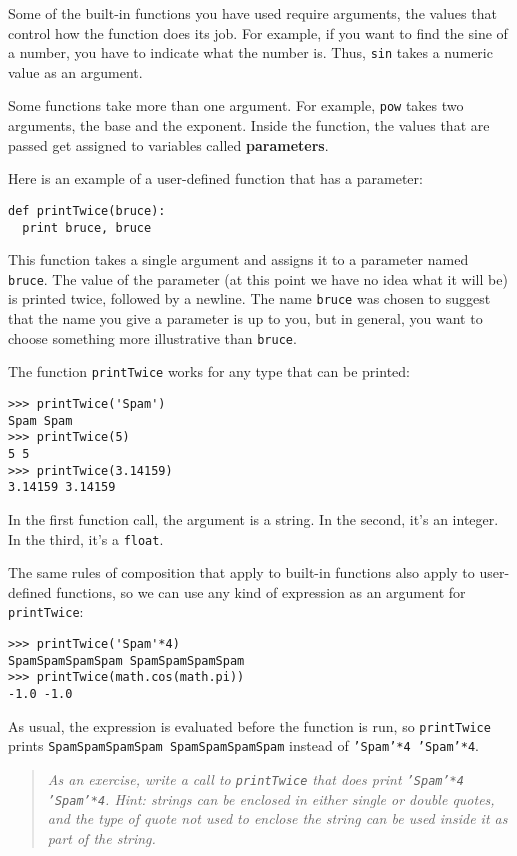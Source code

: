 Some of the built-in functions you have used require arguments, the
values that control how the function does its job.  For example, if
you want to find the sine of a number, you have to indicate what the
number is.  Thus, {\tt sin} takes a numeric value as an argument.

Some functions take more than one argument. For example, {\tt pow}
takes two arguments, the base and the exponent.  Inside the function,
the values that are passed get assigned to variables called {\bf parameters}.

Here is an example of a user-defined function that has a parameter:

\beforeverb
\begin{verbatim}
def printTwice(bruce):
  print bruce, bruce
\end{verbatim}
\afterverb
%
This function takes a single argument and assigns it to a parameter
named {\tt bruce}.  The value of the parameter (at this point we
have no idea what it will be) is printed twice, followed by a newline.
The name {\tt bruce} was chosen to suggest that the name you give a
parameter is up to you, but in general, you want to choose something
more illustrative than {\tt bruce}.

The function {\tt printTwice} works for any type that can be printed:

\beforeverb
\begin{verbatim}
>>> printTwice('Spam')
Spam Spam
>>> printTwice(5)
5 5
>>> printTwice(3.14159)
3.14159 3.14159
\end{verbatim}
\afterverb
%
In the first function call, the argument is a string. In the second,
it's an integer. In the third, it's a {\tt float}.

The same rules of composition that apply to built-in functions also
apply to user-defined functions, so we can use any kind of expression
as an argument for {\tt printTwice}:

\beforeverb
\begin{verbatim}
>>> printTwice('Spam'*4)
SpamSpamSpamSpam SpamSpamSpamSpam
>>> printTwice(math.cos(math.pi))
-1.0 -1.0
\end{verbatim}
\afterverb
%
As usual, the expression is evaluated before the function is run, so
{\tt printTwice} prints {\tt SpamSpamSpamSpam SpamSpamSpamSpam} instead of
{\tt 'Spam'*4 'Spam'*4}.

\begin{quote}
{\em As an exercise, write a call to {\tt printTwice} that does print
{\tt 'Spam'*4 'Spam'*4}.  Hint: strings can be enclosed in either single or 
double quotes, and the type of quote not used to enclose the string can be used
inside it as part of the string.}
\end{quote}

